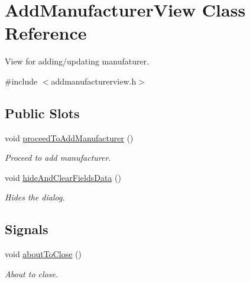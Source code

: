 \hypertarget{class_add_manufacturer_view}{\section{\-Add\-Manufacturer\-View \-Class \-Reference}
\label{class_add_manufacturer_view}
}


\-View for adding/updating manufaturer.  




{\ttfamily \#include $<$addmanufacturerview.\-h$>$}

\subsection*{\-Public \-Slots}
\begin{DoxyCompactItemize}
\item 
void \hyperlink{class_add_manufacturer_view_adffa3033e8f5358ca10472990baa150d}{proceed\-To\-Add\-Manufacturer} ()
\begin{DoxyCompactList}\small\item\em \-Proceed to add manufacturer. \end{DoxyCompactList}\item 
void \hyperlink{class_add_manufacturer_view_a6001ceac59b6e33f4949db948cca90dc}{hide\-And\-Clear\-Fields\-Data} ()
\begin{DoxyCompactList}\small\item\em \-Hides the dialog. \end{DoxyCompactList}\end{DoxyCompactItemize}
\subsection*{\-Signals}
\begin{DoxyCompactItemize}
\item 
void \hyperlink{class_add_manufacturer_view_acbe4a3df044983ab0bbbd9cd50b15d04}{about\-To\-Close} ()
\begin{DoxyCompactList}\small\item\em \-About to close. \end{DoxyCompactList}\end{DoxyCompactItemize}
